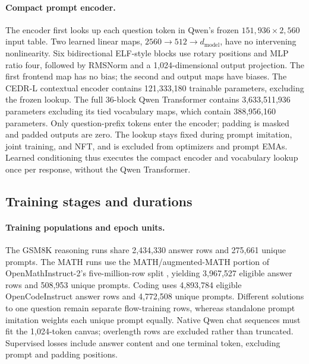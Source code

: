 \documentclass[11pt,letterpaper]{article}
\begin{document}
\paragraph{Compact prompt encoder.}
The encoder first looks up each question token in Qwen's frozen $151{,}936\times2{,}560$ input table. Two learned linear maps, $2560\to512\to d_{\mathrm{model}}$, have no intervening nonlinearity. Six bidirectional ELF-style blocks use rotary positions and MLP ratio four, followed by RMSNorm and a 1,024-dimensional output projection. The first frontend map has no bias; the second and output maps have biases. The CEDR-L contextual encoder contains 121,333,180 trainable parameters, excluding the frozen lookup. The full 36-block Qwen Transformer contains 3,633,511,936 parameters excluding its tied vocabulary maps, which contain 388,956,160 parameters. Only question-prefix tokens enter the encoder; padding is masked and padded outputs are zero. The lookup stays fixed during prompt imitation, joint training, and NFT, and is excluded from optimizers and prompt EMAs. Learned conditioning thus executes the compact encoder and vocabulary lookup once per response, without the Qwen Transformer.

\subsection{Training stages and durations}
\label{app:trainingstages}


\paragraph{Training populations and epoch units.}
The GSM8K reasoning runs share 2,434,330 answer rows and 275,661 unique prompts. The MATH runs use the MATH/augmented-MATH portion of OpenMathInstruct-2's five-million-row split \citep{openmath}, yielding 3,967,527 eligible answer rows and 508,953 unique prompts. Coding uses 4,893,784 eligible OpenCodeInstruct answer rows and 4,772,508 unique prompts. Different solutions to one question remain separate flow-training rows, whereas standalone prompt imitation weights each unique prompt equally. Native Qwen chat sequences must fit the 1,024-token canvas; overlength rows are excluded rather than truncated. Supervised losses include answer content and one terminal token, excluding prompt and padding positions.
\end{document}
